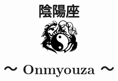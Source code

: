 \documentclass[a4paper,12pt,oneside]{article}
\begin{document}
\begin{CJK*}{UTF8}{min}%

\title{
   \Huge{陰陽座}\\
   \vspace{7mm}
   \includegraphics[width=20mm]{onmyouza_logo}\\
   \- 〜 \- Onmyouza \- 〜 \-
}

\date{}
\maketitle

\tableofcontents
















\end{CJK*}
\end{document}
